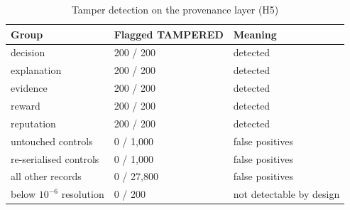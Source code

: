 \begin{table}[t]
\caption{Tamper detection on the provenance layer (H5)}\label{tab:provenance}
\footnotesize
\begin{tabular}{@{}lll@{}}
\toprule
Group & Flagged TAMPERED & Meaning \\
\midrule
decision & 200 / 200 & detected \\
explanation & 200 / 200 & detected \\
evidence & 200 / 200 & detected \\
reward & 200 / 200 & detected \\
reputation & 200 / 200 & detected \\
untouched controls & 0 / 1,000 & false positives \\
re-serialised controls & 0 / 1,000 & false positives \\
all other records & 0 / 27,800 & false positives \\
below $10^{-6}$ resolution & 0 / 200 & not detectable by design \\
\bottomrule
\end{tabular}
\end{table}
